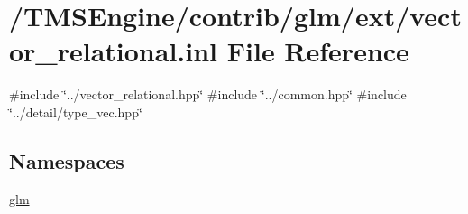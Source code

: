 \hypertarget{vector__relational_8inl}{}\section{/\+T\+M\+S\+Engine/contrib/glm/ext/vector\+\_\+relational.inl File Reference}
\label{vector__relational_8inl}
{\ttfamily \#include \char`\"{}../vector\+\_\+relational.\+hpp\char`\"{}}\newline
{\ttfamily \#include \char`\"{}../common.\+hpp\char`\"{}}\newline
{\ttfamily \#include \char`\"{}../detail/type\+\_\+vec.\+hpp\char`\"{}}\newline
\subsection*{Namespaces}
\begin{DoxyCompactItemize}
\item 
 \hyperlink{namespaceglm}{glm}
\end{DoxyCompactItemize}
